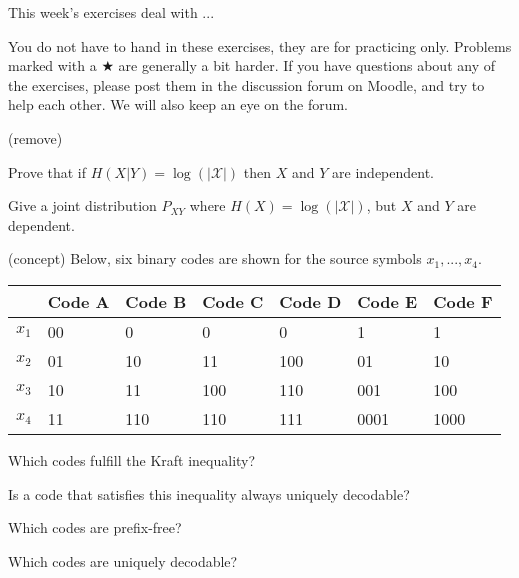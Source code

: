 \documentclass[a4paper,10pt,landscape,twocolumn]{scrartcl}
\newcommand\deadline{Friday November 18th, 20:00h}
\begin{document}
\practiceproblems

{\sffamily\noindent
This week's exercises deal with ...

You do not have to hand in these exercises, they are for practicing only. Problems marked with a $\bigstar$ are generally a bit harder. If you have questions about any of the exercises, please post them in the discussion forum on Moodle, and try to help each other. We will also keep an eye on the forum.
}



\begin{exercise}
(remove)
	\begin{subex}
	Prove that if $H(X|Y) = \log(|\mathcal{X}|)$ then $X$ and $Y$ are independent.
	\end{subex}
	
	\begin{subex}
	Give a joint distribution $P_{XY}$ where $H(X) = \log(|\mathcal{X}|)$, but $X$ and $Y$ are dependent.
	\end{subex}
\end{exercise}

\begin{exercise}
(concept) Below, six binary codes are shown for the source symbols $x_1, ..., x_4$.
\begin{center}
\begin{tabular}{l | l l l l l l}
&Code A& Code B & Code C & Code D & Code E & Code F\\
\hline
$x_1$ & 00 & 0    & 0     &  0     & 1    & 1\\
$x_2$ & 01 & 10  & 11   & 100  & 01  & 10\\
$x_3$ & 10 & 11  & 100 & 110  & 001 & 100\\
$x_4$ & 11 & 110 & 110 & 111 & 0001 & 1000\\
\end{tabular}
\end{center}
	\begin{subex}[(1pt)]
	Which codes fulfill the Kraft inequality?
	\end{subex}
	\begin{subex}[(1pt)]
	Is a code that satisfies this inequality always uniquely decodable?
	\end{subex}
	\begin{subex}[(1pt)]
	Which codes are prefix-free?
	\end{subex}
	\begin{subex}[(1pt)]
	Which codes are uniquely decodable?
	\end{subex}
\end{exercise}
\end{document}
